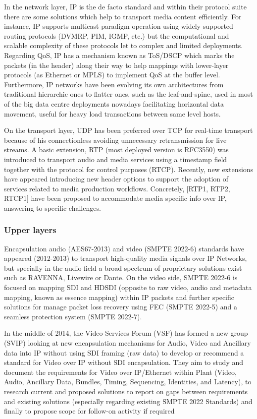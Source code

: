 In the network layer, IP is the de facto standard and within their protocol suite there are some solutions
which help to transport media content efficiently. For instance, IP supports multicast paradigm
operation using widely supported routing protocols (DVMRP, PIM, IGMP, etc.) but the
computational and scalable complexity of these protocols let to complex and limited deployments.
Regarding QoS, IP has a mechanism known as ToS/DSCP which marks the packets (in the header)
along their way to help mappings with lower-layer protocols (as Ethernet or MPLS) to implement
QoS at the buffer level. Furthermore, IP networks have been evolving its own architectures from
traditional hierarchic ones to flatter ones, such as the leaf-and-spine, used in most of the big data
centre deployments nowadays facilitating horizontal data movement, useful for heavy load
transactions between same level hosts.

On the transport layer, UDP has been preferred over TCP for real-time transport because of his
connectionless avoiding unnecessary retransmission for live streams. A basic extension, RTP (most
deployed version is RFC3550) was introduced to transport audio and media services using a
timestamp field together with the protocol for control purposes (RTCP). Recently, new extensions
have appeared introducing new header options to support the adoption of services related to media
production workflows. Concretely, [RTP1, RTP2, RTCP1] have been proposed to accommodate
media specific info over IP, answering to specific challenges.

\subsubsection{Upper layers}

Encapsulation audio (AES67-2013) and video (SMPTE 2022-6) standards have
appeared (2012-2013) to transport high-quality media signals over IP Networks, but specially in the
audio field a broad spectrum of proprietary solutions exist such as RAVENNA, Livewire or Dante.
On the video side, SMPTE 2022-6 is focused on mapping SDI and HDSDI (opposite to raw video,
audio and metadata mapping, known as essence mapping) within IP packets and further specific
solutions for manage packet loss recovery using FEC (SMPTE 2022-5) and a seamless protection
system (SMPTE 2022-7).

In the middle of 2014, the Video Services Forum (VSF) has formed a new group (SVIP) looking at
new encapsulation mechanisms for Audio, Video and Ancillary data into IP without using SDI
framing (raw data) to develop or recommend a standard for Video over IP without SDI encapsulation.
They aim to study and document the requirements for Video over IP/Ethernet within Plant (Video,
Audio, Ancillary Data, Bundles, Timing, Sequencing, Identities, and Latency), to research current
and proposed solutions to report on gaps between requirements and existing solutions (especially
regarding existing SMPTE 2022 Standards) and finally to propose scope for follow-on activity if
required

